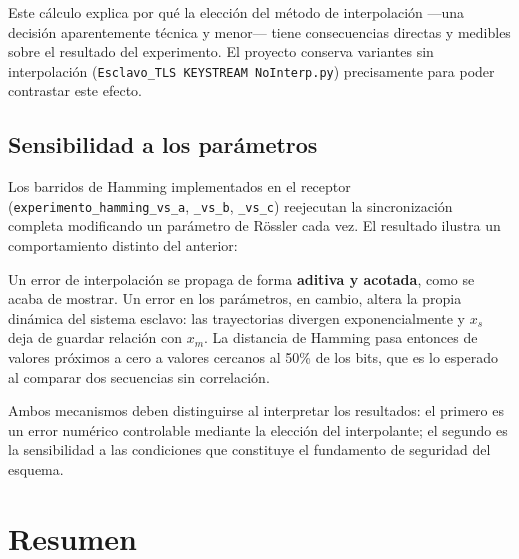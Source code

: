 \documentclass[12pt,a4paper]{article}
\begin{document}
Este cálculo explica por qué la elección del método de interpolación —una decisión aparentemente técnica y menor— tiene consecuencias directas y medibles sobre el resultado del experimento. El proyecto conserva variantes sin interpolación (\texttt{Esclavo\_TLS KEYSTREAM NoInterp.py}) precisamente para poder contrastar este efecto.

\subsection{Sensibilidad a los parámetros}

Los barridos de Hamming implementados en el receptor (\texttt{experimento\_hamming\_vs\_a}, \texttt{\_vs\_b}, \texttt{\_vs\_c}) reejecutan la sincronización completa modificando un parámetro de Rössler cada vez. El resultado ilustra un comportamiento distinto del anterior:

Un error de interpolación se propaga de forma \textbf{aditiva y acotada}, como se acaba de mostrar. Un error en los parámetros, en cambio, altera la propia dinámica del sistema esclavo: las trayectorias divergen exponencialmente y $x_s$ deja de guardar relación con $x_m$. La distancia de Hamming pasa entonces de valores próximos a cero a valores cercanos al 50\% de los bits, que es lo esperado al comparar dos secuencias sin correlación.

Ambos mecanismos deben distinguirse al interpretar los resultados: el primero es un error numérico controlable mediante la elección del interpolante; el segundo es la sensibilidad a las condiciones que constituye el fundamento de seguridad del esquema.

\section{Resumen}
\end{document}
